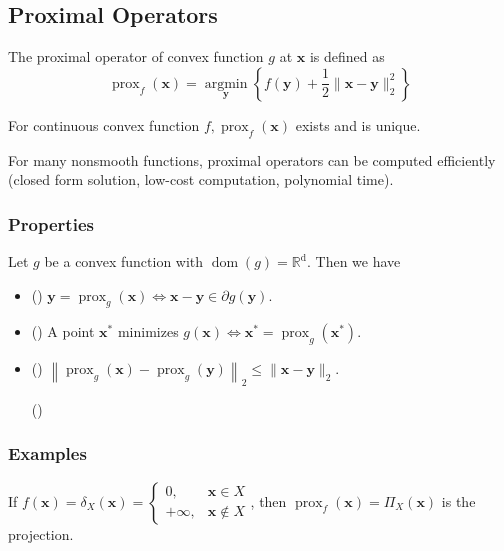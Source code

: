 \subsection*{Proximal Operators}
The proximal operator of convex function $g$ at $\mathbf{x}$ is defined as
$$
\operatorname{prox}_{f}(\mathbf{x})=\underset{\mathbf{y}}{\operatorname{argmin}}\left\{f(\mathbf{y})+\frac{1}{2}\|\mathbf{x}-\mathbf{y}\|_{2}^{2}\right\}
$$

For continuous convex function $f, \operatorname{prox}_{f}(\mathbf{x})$ exists and is unique.

For many nonsmooth functions, proximal operators can be computed efficiently (closed form solution, low-cost computation, polynomial time).






\subsubsection*{Properties}
Let ${g}$ be a convex function with $\operatorname{dom}({g})=\mathbb{R}^{\mathrm{d}}$. Then we have
\begin{itemize}[leftmargin=*]
    \item () $\mathbf{y}=\operatorname{prox}_{{g}}(\mathbf{x}) \Longleftrightarrow \mathbf{x}-\mathbf{y} \in \partial {g}(\mathbf{y})$.
    \item () A point $\mathbf{x}^{*}$ minimizes ${g}(\mathbf{x}) \Longleftrightarrow \mathbf{x}^{*}=\operatorname{prox}_{{g}}\left(\mathbf{x}^{*}\right)$.
    \item () $\left\|\operatorname{prox}_{g}(\mathbf{x})-\operatorname{prox}_{g}(\mathbf{y})\right\|_{2} \leq\|\mathbf{x}-\mathbf{y}\|_{2}$.
    
    ()
\end{itemize}



\subsubsection*{Examples}
If $f(\mathbf{x})=\delta_{X}(\mathbf{x})=\left\{\begin{array}{ll}0, & \mathbf{x} \in X \\ +\infty, & \mathbf{x} \notin X\end{array}\right.$, then $\operatorname{prox}_{f}(\mathbf{x})=\Pi_{X}(\mathbf{x})$ is the projection.

